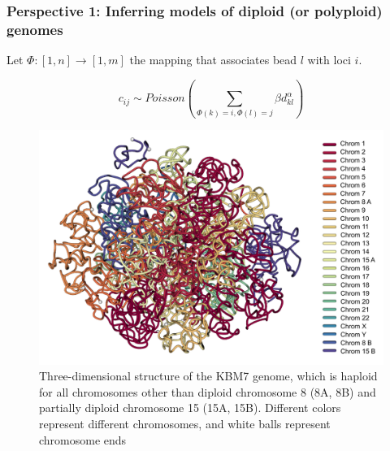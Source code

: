 \documentclass[xcolor=dvipsnames]{beamer}
\begin{document}
\begin{frame}
\frametitle{Perspective 1: Inferring models of diploid (or polyploid) genomes}

Let
$\Phi:[1,n] \rightarrow [1, m]$ the mapping that associates bead $l$ with loci
$i$.

\begin{equation*}
c_{ij} \sim Poisson(\sum_{\Phi(k) = i, \Phi(l) = j} \beta d_{kl}^{\alpha}) 
\end{equation*}

\begin{figure}
\begin{center}
\includegraphics[width=0.6\linewidth]{images_/all_with_legend.png}
\end{center}
\caption{Three-dimensional structure of the KBM7 genome,
which is haploid for all chromosomes other than diploid chromosome 8 (8A, 8B)
and partially diploid chromosome 15 (15A, 15B). Different colors represent
different
chromosomes, and white balls represent chromosome ends}
\end{figure}
\end{frame}
\end{document}
